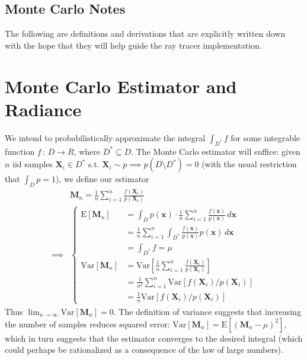 \documentclass{article}
\newcommand{\E}{\mathrm{E}}
\newcommand{\Var}{\mathrm{Var}}
\begin{document}
  \begin{center}
    \section*{Monte Carlo Notes}
  \end{center}
  
  The following are definitions and derivations that 
  are explicitly written down with the hope that 
  they will help guide the ray tracer implementation.

  \section{Monte Carlo Estimator and Radiance}

  We intend to probabilistically approximate the integral $\int_{D^\ast}f$ for some 
  integrable function $f\,:\,D\to R$, where $D^\ast \subseteq D$.
  The Monte Carlo estimator will suffice:
  given $n$ iid samples $\bm{X}_i \in D^\ast$ s.t. $\bm{X}_i \sim p \implies 
  p(D \setminus D^\ast) = 0$ 
  (with the usual restriction that $\int_{D} p = 1$), we define our estimator 
  \begin{align*}
    &\bm{M}_n = \frac{1}{n}\sum_{i=1}^{n} \frac{f(\bm{X}_i)}{p(\bm{X}_i)}\\
    \implies &\begin{cases}
      \E[\bm{M}_n] &= \int_{D}p(\bm{x})\cdot\frac{1}{n}\sum_{i=1}^{n} \frac{f(\bm{x})}{p(\bm{x})}\,d\bm{x}\\
                   &= \frac{1}{n}\sum_{i=1}^{n}
                      \int_{D^\ast}\frac{f(\bm{x})}{p(\bm{x})} p(\bm{x})\,d\bm{x}\\
                   &= \int_{D^\ast}f = \mu\\
      \Var[\bm{M}_n] &= \Var[\frac{1}{n}\sum_{i=1}^{n} \frac{f(\bm{X}_i)}{p(\bm{X}_i)}]\\
                     &= \frac{1}{n^2}\sum_{i=1}^{n}\Var[f(\bm{X}_i) / p(\bm{X}_i)]\\
                     &= \frac{1}{n}\Var[f(\bm{X}_i) / p(\bm{X}_i)]
    \end{cases}
  \end{align*}
  Thus $\lim_{n \to \infty} \Var[\bm{M}_n] = 0$. 
  The definition of variance suggests that 
  increasing the number of samples reduces 
  squared error: $\Var[\bm{M}_n] = \E[(\bm{M}_n - \mu)^2]$, 
  which in turn suggests that the estimator converges to the desired integral 
  (which could perhaps be rationalized as a consequence of the law of large numbers).
\end{document}
